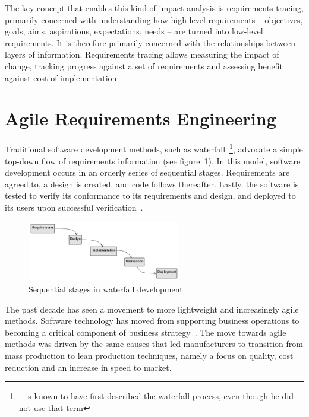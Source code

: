 \documentclass[dissertation,final]{softeng}
\begin{document}
The key concept that enables this kind of impact analysis is requirements tracing, primarily concerned with understanding how high-level requirements -- objectives, goals, aims, aspirations, expectations, needs -- are turned into low-level requirements. It is therefore primarily concerned with the relationships between layers of information. Requirements tracing allows measuring the impact of change, tracking progress against a set of requirements and assessing benefit against cost of implementation~\citep{Hull2011}.

\section{Agile Requirements Engineering}
\label{sec:agile_requirements}
Traditional software development methods, such as waterfall~\footnote{~\citet{royce1970managing} is known to have first described the waterfall process, even though he did not use that term}, advocate a simple top-down flow of requirements information (see figure~\ref{fig:waterfall}). In this model, software development occurs in an orderly series of sequential stages. Requirements are agreed to, a design is created, and code follows thereafter. Lastly, the software is tested to verify its conformance to its requirements and design, and deployed to its users upon successful verification~\citep{Leffingwell2011}.

\begin{figure}[h!]
\includegraphics[width=0.60\textwidth]{waterfall2}
\centering
\caption[Sequential stages in waterfall development]{Sequential stages in waterfall development~\citep{Leffingwell2011}}
\label{fig:waterfall}
\end{figure}

The past decade has seen a movement to more lightweight and increasingly agile methods. Software technology has moved from supporting business operations to becoming a critical component of business strategy~\citep{Highsmith:2000:ASD:323922}. The move towards agile methods was driven by the same causes that led manufacturers to transition from mass production to lean production techniques, namely a focus on quality, cost reduction and an increase in speed to market.
\end{document}
